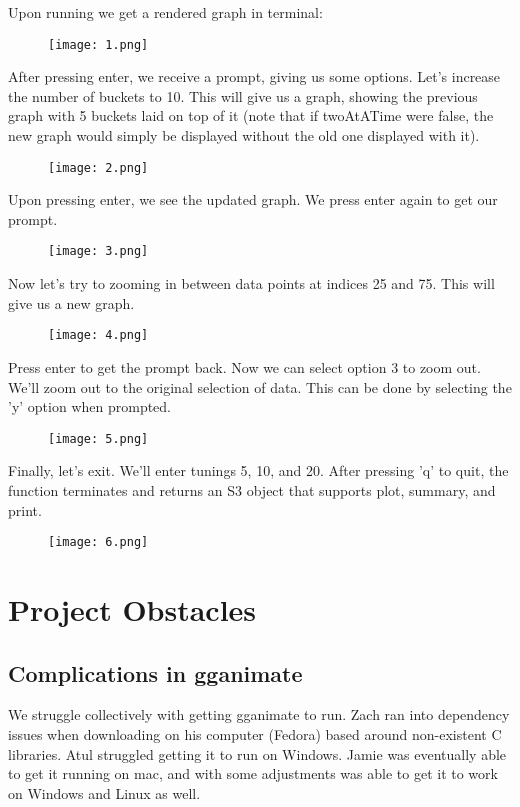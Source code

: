 \documentclass{article}
\begin{document}
Upon running we get a rendered graph in terminal:\\
\begin{figure}[H]
\texttt{[image: 1.png]}
\centering
\end{figure}

After pressing enter, we receive a prompt, giving us some options. Let's increase the number of buckets to 10. This will give us a graph, showing the previous graph with 5 buckets laid on top of it (note that if twoAtATime were false, the new graph would simply be displayed without the old one displayed with it).

\begin{figure}[H]
\texttt{[image: 2.png]}
\centering
\end{figure}


Upon pressing enter, we see the updated graph. We press enter again to get our prompt.

\begin{figure}[H]
\texttt{[image: 3.png]}
\centering
\end{figure}

Now let's try to zooming in between data points at indices 25 and 75. This will give us a new graph.

\begin{figure}[H]
\texttt{[image: 4.png]}
\centering
\end{figure}

Press enter to get the prompt back. Now we can select option 3 to zoom out. We'll zoom out to the original selection of data. This can be done by selecting the 'y' option when prompted.

\begin{figure}[H]
\texttt{[image: 5.png]}
\centering
\end{figure}

Finally, let's exit. We'll enter tunings 5, 10, and 20. After pressing 'q' to quit, the function terminates and returns an S3 object that supports plot, summary, and print.

\begin{figure}[H]
\texttt{[image: 6.png]}
\centering
\end{figure}

\section{Project Obstacles}
\subsection{Complications in gganimate}
We struggle collectively with getting gganimate to run. Zach ran into dependency issues when downloading on his computer (Fedora) based around non-existent C libraries. Atul struggled getting it to run on Windows. Jamie was eventually able to get it running on mac, and with some adjustments was able to get it to work on Windows and Linux as well.
\end{document}
